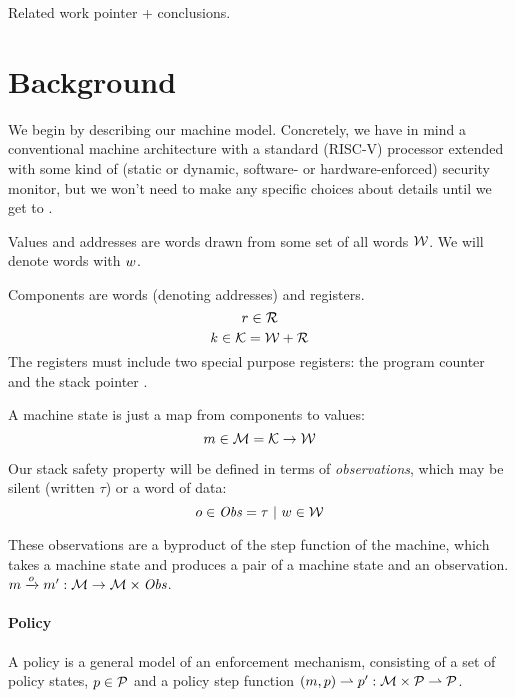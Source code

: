 \documentclass[acmsmall,review,anonymous]{acmart}\settopmatter{printfolios=true,printccs=false,printacmref=false}
\begin{document}
Related work pointer + conclusions.

\section{Background}

We begin by describing our machine model. Concretely, we have in mind a
conventional machine architecture with a standard (RISC-V) processor
extended with some kind of (static or dynamic, software- or
hardware-enforced) security monitor, but we won't need to make any
specific choices about details until we get to .

Values and addresses are words drawn from some set of all words ${\mathcal W}$. We will
denote words with $w$.

Components are words (denoting addresses) and registers.
%
    \[r \in {\mathcal R}\]
    \[k \in {\mathcal K} = {\mathcal W} + {\mathcal R} \]
%
The registers must include two special purpose registers: the program
counter \PCname and the stack pointer \SP.

A machine state is just a map from components to values:
%
\[m \in {\mathcal M} = {\mathcal K} \rightarrow {\mathcal W}\]


Our stack safety property will be defined in terms of {\em observations}, which may be
silent (written $\tau$) or a word of data:
%
\[o \in \mathit{Obs} = \tau ~ | ~ w \in {\mathcal W}\]

These observations are a byproduct of the step function of the
machine, which takes a machine state and produces a pair of a
machine state and an observation.
%
\(m \xrightarrow{o} m' : {\mathcal M} \rightarrow {\mathcal M} \times \mathit{Obs} \).

\paragraph*{Policy}
    
A policy is a general model of an enforcement mechanism, consisting of
a set of policy states, \(p \in \mathcal{P}\) and a policy step function
\((m, p) \rightharpoonup p' : {\mathcal M} \times \mathcal{P}
\rightharpoonup \mathcal{P}\).

\end{document}
